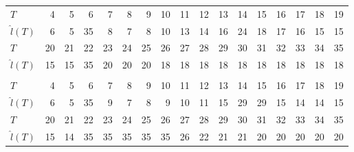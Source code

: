 \documentclass[12pt,a4paper]{article}
\begin{document}
\begin{table}
\begin{tabular*}{\textheight}{@{\extracolsep{\fill}}lrrrrrrrrrrrrrrrr}
			\addlinespace[2.5pt]
			\midrule
			$T$ & 4 & 5 & 6 & 7 & 8 & 9 & 10 & 11 & 12 & 13 & 14 & 15 & 16 & 17 & 18 & 19 \\
			$\hat{l}(T)$ & 6 & 5 & 35 & 8 & 7 & 8 & 10 & 13 & 14 & 16 & 24 & 18 & 17 & 16 & 15 & 15 \\
			$T$ & 20 & 21 & 22 & 23 & 24 & 25 & 26 & 27 & 28 & 29 & 30 & 31 & 32 & 33 & 34 & 35 \\
			$\hat{l}(T)$ & 15 & 15 & 35 & 20 & 20 & 20 & 18 & 18 & 18 & 18 & 18 & 18 & 18 & 18 & 18 & 18 \\
			\midrule\addlinespace[2.5pt]
			\multicolumn{17}{c}{\textbf{$\tau=0.95,\ T_{\mathrm{entry}}(3)=28$}} \\
			\addlinespace[2.5pt]
			\midrule
			$T$ & 4 & 5 & 6 & 7 & 8 & 9 & 10 & 11 & 12 & 13 & 14 & 15 & 16 & 17 & 18 & 19 \\
			$\hat{l}(T)$ & 6 & 5 & 35 & 9 & 7 & 8 & 9 & 10 & 11 & 15 & 29 & 29 & 15 & 14 & 14 & 15 \\
			$T$ & 20 & 21 & 22 & 23 & 24 & 25 & 26 & 27 & 28 & 29 & 30 & 31 & 32 & 33 & 34 & 35 \\
			$\hat{l}(T)$ & 15 & 14 & 35 & 35 & 35 & 35 & 35 & 26 & 22 & 21 & 21 & 20 & 20 & 20 & 20 & 20 \\
			\bottomrule
		\end{tabular*}
	\end{table}
	
\end{document}
